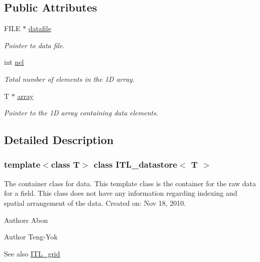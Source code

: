 \subsection*{Public Attributes}
\begin{DoxyCompactItemize}
\item 
FILE $\ast$ \hyperlink{classITL__datastore_a63d8cfcd308a6dd6763bd784c3870197}{datafile}
\begin{DoxyCompactList}\small\item\em Pointer to data file. \item\end{DoxyCompactList}\item 
int \hyperlink{classITL__datastore_aceb858e3255e686bc8567e4f203adc88}{nel}
\begin{DoxyCompactList}\small\item\em Total number of elements in the 1D array. \item\end{DoxyCompactList}\item 
T $\ast$ \hyperlink{classITL__datastore_a63e6e00d86fa6f227686e0612518e26e}{array}
\begin{DoxyCompactList}\small\item\em Pointer to the 1D array containing data elements. \item\end{DoxyCompactList}\end{DoxyCompactItemize}


\subsection{Detailed Description}
\subsubsection*{template$<$class T$>$ class ITL\_\-datastore$<$ T $>$}

The container class for data. This template class is the container for the raw data for a field. This class does not have any information regarding indexing and spatial arrangement of the data. Created on: Nov 18, 2010. \begin{DoxyAuthor}{Authors}
Abon 
\end{DoxyAuthor}
\begin{DoxyAuthor}{Author}
Teng-\/Yok 
\end{DoxyAuthor}
\begin{DoxySeeAlso}{See also}
\hyperlink{classITL__grid}{ITL\_\-grid} 
\end{DoxySeeAlso}


